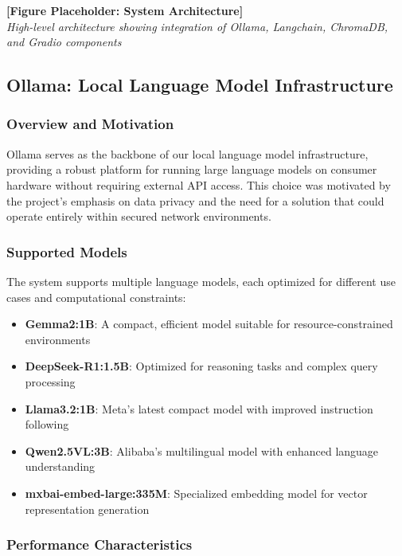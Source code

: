 \documentclass[12pt,letterpaper]{article}
\begin{document}
\begin{center}
\textbf{[Figure Placeholder: System Architecture]}\\
\textit{High-level architecture showing integration of Ollama, Langchain, ChromaDB, and Gradio components}
\end{center}

\subsection{Ollama: Local Language Model Infrastructure}

\subsubsection{Overview and Motivation}

Ollama serves as the backbone of our local language model infrastructure, providing a robust platform for running large language models on consumer hardware without requiring external API access. This choice was motivated by the project's emphasis on data privacy and the need for a solution that could operate entirely within secured network environments.

\subsubsection{Supported Models}

The system supports multiple language models, each optimized for different use cases and computational constraints:

\begin{itemize}
    \item \textbf{Gemma2:1B}: A compact, efficient model suitable for resource-constrained environments
    \item \textbf{DeepSeek-R1:1.5B}: Optimized for reasoning tasks and complex query processing
    \item \textbf{Llama3.2:1B}: Meta's latest compact model with improved instruction following
    \item \textbf{Qwen2.5VL:3B}: Alibaba's multilingual model with enhanced language understanding
    \item \textbf{mxbai-embed-large:335M}: Specialized embedding model for vector representation generation
\end{itemize}

\subsubsection{Performance Characteristics}
\end{document}
